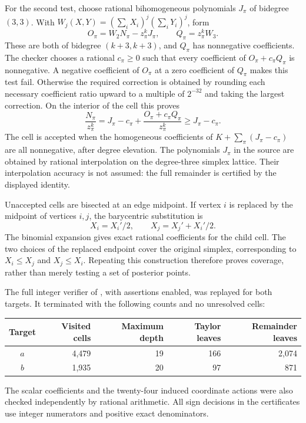 For the second test, choose rational bihomogeneous polynomials $J_\pi$ of
bidegree $(3,3)$.  With
$W_j(X,Y)=(\sum_iX_i)^j(\sum_iY_i)^j$, form
\[
 O_\pi=W_2N_\pi-z_\pi^kJ_\pi,
 \qquad Q_\pi=z_\pi^kW_3.
\]
These are both of bidegree $(k+3,k+3)$, and $Q_\pi$ has nonnegative
coefficients.  The checker chooses a rational $c_\pi\ge0$ such that every
coefficient of $O_\pi+c_\pi Q_\pi$ is nonnegative.  A negative coefficient
of $O_\pi$ at a zero coefficient of $Q_\pi$ makes this test fail.  Otherwise
the required correction is obtained by rounding each necessary coefficient
ratio upward to a multiple of $2^{-32}$ and taking the largest correction.
On the interior of the cell this proves
\[
 \frac{N_\pi}{z_\pi^k}
 =J_\pi-c_\pi+
   \frac{O_\pi+c_\pi Q_\pi}{z_\pi^k}
 \ge J_\pi-c_\pi.
\]
The cell is accepted when the homogeneous coefficients of
$K+\sum_\pi(J_\pi-c_\pi)$ are all nonnegative, after degree elevation.
The polynomials $J_\pi$ in the source are obtained by rational interpolation
on the degree-three simplex lattice.  Their interpolation accuracy is not
assumed: the full remainder is certified by the displayed identity.

Unaccepted cells are bisected at an edge midpoint.  If vertex $i$ is
replaced by the midpoint of vertices $i,j$, the barycentric substitution is
\[
 X_i=X_i'/2,\qquad X_j=X_j'+X_i'/2.
\]
The binomial expansion gives exact rational coefficients for the child
cell.  The two choices of the replaced endpoint cover the original
simplex, corresponding to $X_i\le X_j$ and $X_j\le X_i$.  Repeating this
construction therefore proves coverage, rather than merely testing a set
of posterior points.

The full integer verifier of \cite{OpenAI4}, with assertions enabled, was
replayed for both targets.  It terminated with the following counts and no
unresolved cells:
\begin{center}
\begin{tabular}{crrrr}
\hline
Target & Visited cells & Maximum depth & Taylor leaves & Remainder leaves\\
\hline
$a$ & 4,479 & 19 & 166 & 2,074\\
$b$ & 1,935 & 20 & 97 & 871\\
\hline
\end{tabular}
\end{center}
The scalar coefficients and the twenty-four induced coordinate actions were
also checked independently by rational arithmetic.  All sign decisions in
the certificates use integer numerators and positive exact denominators.

